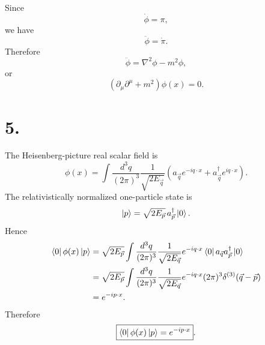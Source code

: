 \documentclass{article}
\begin{document}
Since
\begin{equation}
    \dot\phi=\pi,
\end{equation}
we have
\begin{equation}
    \ddot\phi=\dot\pi.
\end{equation}
Therefore
\begin{equation}
    \ddot\phi
    =
    \nabla^2\phi-m^2\phi,
\end{equation}
or
\begin{equation}
    \boxed{
    (\partial_\mu\partial^\mu+m^2)\phi(x)=0
    }.
\end{equation}


\section*{5.}

The Heisenberg-picture real scalar field is
\begin{equation}
    \phi(x)
    =
    \int\frac{d^3q}{(2\pi)^3}
    \frac{1}{\sqrt{2E_{\vec q}}}
    \left(
        a_{\vec q}e^{-iq\cdot x}
        +
        a_{\vec q}^{\dagger}e^{iq\cdot x}
    \right).
\end{equation}
The relativistically normalized one-particle state is
\begin{equation}
    \ket{p}
    =
    \sqrt{2E_{\vec p}}\,
    a_{\vec p}^{\dagger}\ket{0}.
\end{equation}
Hence
\begin{equation}
\begin{split}
    \bra{0}\phi(x)\ket{p}
    &=
    \sqrt{2E_{\vec p}}
    \int\frac{d^3q}{(2\pi)^3}
    \frac{1}{\sqrt{2E_{\vec q}}}
    e^{-iq\cdot x}
    \bra{0}a_{\vec q}a_{\vec p}^{\dagger}\ket{0}
    \\
    &=
    \sqrt{2E_{\vec p}}
    \int\frac{d^3q}{(2\pi)^3}
    \frac{1}{\sqrt{2E_{\vec q}}}
    e^{-iq\cdot x}
    (2\pi)^3\delta^{(3)}(\vec q-\vec p)
    \\
    &=
    e^{-ip\cdot x}.
\end{split}
\end{equation}
Therefore
\begin{equation}
    \boxed{
    \bra{0}\phi(x)\ket{p}
    =
    e^{-ip\cdot x}
    }.
\end{equation}
\end{document}
